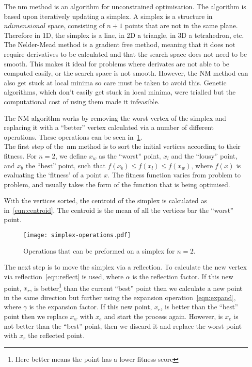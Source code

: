 The \gls*{nm} method is an algorithm for unconstrained optimisation. 
The algorithm is based upon iteratively updating a simplex. 
A simplex is a structure in $n dimensional$ space, consisting of $n+1$ points that are not in the same plane. 
Therefore in 1D, the simplex is a line, in 2D a triangle, in 3D a tetrahedron, etc. 
The Nelder-Mead method is a gradient free method, meaning that it does not require derivatives to be calculated and that the search space does not need to be smooth.
This makes it ideal for problems where derivates are not able to be computed easily, or the search space is not smooth.
However, the NM method can also get stuck at local minima so care must be taken to avoid this.
Genetic algorithms, which don't easily get stuck in local minima, were trialled but the computational cost of using them made it infeasible. 

The NM algorithm works by removing the worst vertex of the simplex and replacing it with a ``better'' vertex calculated via a number of different operations.
These operations can be seen in~\cref{fig:NM-operations}.\\

The first step of the~\gls*{nm} method is to sort the initial vertices according to their fitness.
For $n=2$, we define $x_w$ as the ``worst'' point, $x_l$ and the ``lousy'' point, and $x_b$ the ``best'' point, such that $f(x_b)\leq f(x_l)\leq f(x_w)$, where $f(x)$ is evaluating the `fitness' of a point $x$. 
The fitness function varies from problem to problem, and usually takes the form of the function that is being optimised.

With the vertices sorted, the centroid of the simplex is calculated as in~\cref{eqn:centroid}.
The centroid is the mean of all the vertices bar the ``worst'' point.

\begin{figure}[!htbp]
    \centering
    \texttt{[image: simplex-operations.pdf]}
    \caption{Operations that can be preformed on a simplex for $n=2$.}
    \label{fig:NM-operations}
\end{figure}

The next step is to move the simplex via a reflection.
To calculate the new vertex via reflection~\cref{eqn:reflect} is used, where $\alpha$ is the reflection factor.
If this new point, $x_r$, is better\footnote{Here better means the point has a lower fitness score} than the current ``best'' point then we calculate a new point in the same direction but further using the expansion operation~\cref{eqn:expand}, where $\gamma$ is the expansion factor.
If this new point, $x_e$, is better than the ``best'' point then we replace $x_w$ with $x_e$ and start the process again.
However, is $x_e$ is not better than the ``best'' point, then we discard it and replace the worst point with $x_r$ the reflected point.

